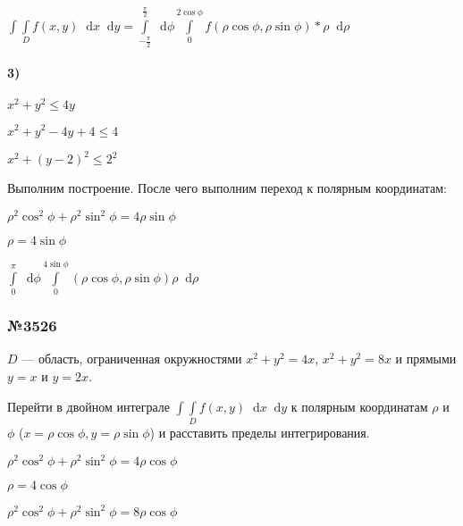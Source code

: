 \documentclass{article}
\newcommand*\diff{\mathop{}\!\mathrm{d}}
\begin{document}
$\int\int\limits_{D} f(x, y) \diff x \diff y = \int\limits_{-\frac{\pi}{2}}^{\frac{\pi}{2}} \diff \phi \int\limits_{0}^{2 \cos \phi} f(\rho \cos \phi, \rho \sin \phi) * \rho \diff \rho$

\paragraph{3)}

$x^2 + y^2 \le 4y$

$x^2 + y^2 - 4y + 4 \le 4$

$x^2 + (y - 2)^2 \le 2^2$

Выполним построение. После чего выполним переход к полярным координатам:

$\rho^2 \cos^2 \phi + \rho^2 \sin^2 \phi = 4 \rho \sin \phi$

$\rho = 4 \sin \phi$

$\int\limits_{0}^{\pi} \diff \phi \int\limits_{0}^{4 \sin \phi}(\rho \cos \phi, \rho \sin \phi) \rho \diff \rho$

\subsubsection{№3526}

$D$ — область, ограниченная окружностями $x^2 + y^2 = 4x$, $x^2 + y^2 = 8x$ и прямыми $y = x$ и $y = 2x$.

Перейти в двойном интеграле $\int\int\limits_{D} f(x, y) \diff x \diff y$ к полярным координатам $\rho$ и $\phi$ ($x = \rho \cos \phi, y = \rho \sin \phi$) и расставить пределы интегрирования.


$\rho^2 \cos^2 \phi + \rho^2 \sin^2 \phi = 4 \rho \cos \phi$

$\rho = 4 \cos \phi$

$\rho^2 \cos^2 \phi + \rho^2 \sin^2 \phi = 8 \rho \cos \phi$
\end{document}
